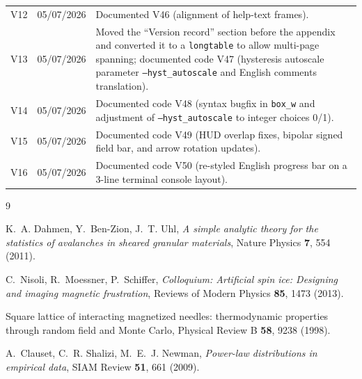 \documentclass[11pt,a4paper]{article}
\newcommand{\code}[1]{\texttt{#1}}
\begin{document}
\begin{tabular}{@{}lll@{}}
V12 & 05/07/2026 & Documented V46 (alignment of help-text frames). \\
V13 & 05/07/2026 & Moved the ``Version record'' section before the appendix and converted it to a \code{longtable} to allow multi-page spanning; documented code V47 (hysteresis autoscale parameter \code{--hyst\_autoscale} and English comments translation). \\
V14 & 05/07/2026 & Documented code V48 (syntax bugfix in \code{box\_w} and adjustment of \code{--hyst\_autoscale} to integer choices 0/1). \\
V15 & 05/07/2026 & Documented code V49 (HUD overlap fixes, bipolar signed field bar, and arrow rotation updates). \\
V16 & 05/07/2026 & Documented code V50 (re-styled English progress bar on a 3-line terminal console layout). \\
\bottomrule
\end{tabular}

\begin{thebibliography}{9}

K.~A. Dahmen, Y.~Ben-Zion, J.~T. Uhl,
\emph{A simple analytic theory for the statistics of avalanches in
sheared granular materials},
Nature Physics \textbf{7}, 554 (2011).

C.~Nisoli, R.~Moessner, P.~Schiffer,
\emph{Colloquium: Artificial spin ice: Designing and imaging magnetic
frustration},
Reviews of Modern Physics \textbf{85}, 1473 (2013).

Square lattice of interacting magnetized needles: thermodynamic
properties through random field and Monte Carlo,
Physical Review B \textbf{58}, 9238 (1998).

A.~Clauset, C.~R. Shalizi, M.~E.~J. Newman,
\emph{Power-law distributions in empirical data},
SIAM Review \textbf{51}, 661 (2009).

\end{thebibliography}
\end{document}
